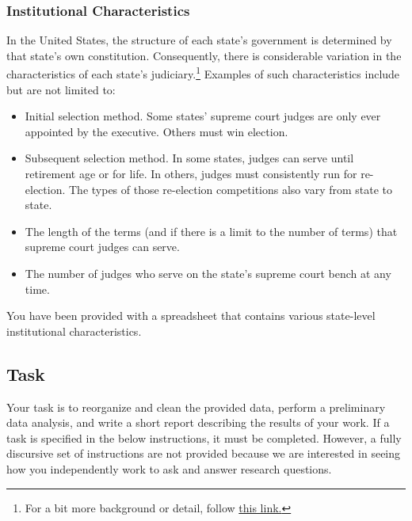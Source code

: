 \documentclass[11pt, letterpaper, twoside]{article}
\begin{document}
\subsubsection*{Institutional Characteristics}
In the United States, the structure of each state's government is determined by that state's own constitution. Consequently, there is considerable variation in the characteristics of each state's judiciary.\footnote{For a bit more background or detail, follow \href{https://www.brennancenter.org/judicial-selection-map}{this link.}} Examples of such characteristics include but are not limited to:
\begin{itemize}
    \item Initial selection method. Some states' supreme court judges are only ever appointed by the executive. Others must win election.
    \item Subsequent selection method. In some states, judges can serve until retirement age or for life. In others, judges must consistently run for re-election. The types of those re-election competitions also vary from state to state.
    \item The length of the terms (and if there is a limit to the number of terms) that supreme court judges can serve.
    \item The number of judges who serve on the state's supreme court bench at any time.
\end{itemize}
You have been provided with a spreadsheet that contains various state-level institutional characteristics. 

\subsection*{Task}

Your task is to reorganize and clean the provided data, perform a preliminary data analysis, and write a short report describing the results of your work. If a task is specified in the below instructions, it must be completed. However, a fully discursive set of instructions are not provided because we are interested in seeing how you independently work to ask and answer research questions.
\end{document}

